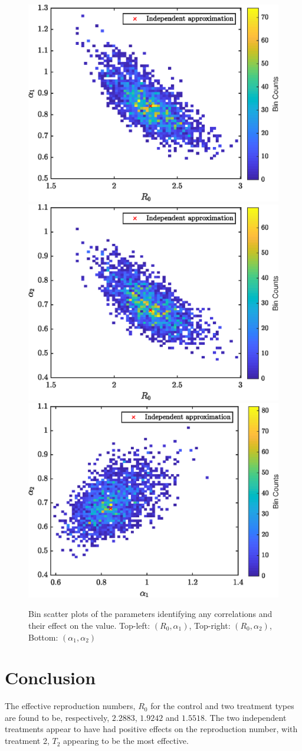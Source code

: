 \documentclass{X:/Documents/Coding/Latex/myassignment}
\begin{document}
\begin{figure}[tbh]
	\centering
	\includegraphics[width=0.45\linewidth]{BinScatter12.eps}
	\includegraphics[width=0.45\linewidth]{BinScatter13.eps}
	\includegraphics[width=0.45\linewidth]{BinScatter23.eps}
	\caption{Bin scatter plots of the parameters identifying any correlations and their effect on the value. Top-left: $(R_0,\alpha_1)$, Top-right: $(R_0, \alpha_2)$, Bottom: $(\alpha_1,\alpha_2)$}
	\label{fig:binscatter}
\end{figure}



\section{Conclusion}

The effective reproduction numbers, $R_0$ for the control and two treatment types are found to be, respectively, $2.2883$, $1.9242$ and $1.5518$. The two independent treatments appear to have had positive effects on the reproduction number, with treatment 2, $T_2$ appearing to be the most effective. 
\end{document}
